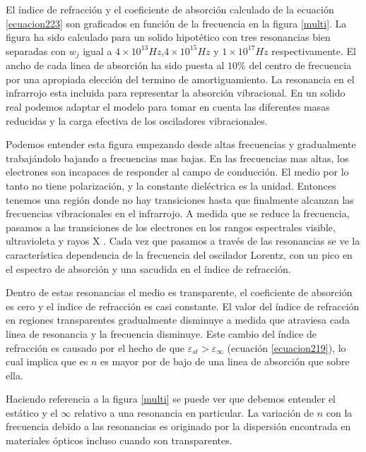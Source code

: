 \documentclass[a4paper,openright,12pt]{book}
\begin{document}
El índice de refracción y el coeficiente de absorción calculado de la ecuación \ref{ecuacion223} son graficados en función de la frecuencia en la figura \ref{multi}. La figura ha sido calculado para un solido hipotético con tres resonancias bien separadas con $w_{j}$ igual a $4\times 10^{13}Hz$,$4\times 10^{15}Hz$ y $1\times 10^{17}Hz$ respectivamente. El ancho de cada linea de absorción ha sido puesta al $10\%$ del centro de frecuencia por una apropiada elección del termino de amortiguamiento. La resonancia en el infrarrojo esta incluida para representar la absorción vibracional. En un solido real podemos adaptar el modelo para tomar en cuenta las diferentes masas reducidas y la carga efectiva de los osciladores vibracionales.

Podemos entender esta figura empezando desde altas frecuencias y gradualmente trabajándolo bajando a frecuencias mas bajas. En las frecuencias mas altas, los electrones son incapaces de responder al campo de conducción. El medio por lo tanto no tiene polarización, y la constante dieléctrica es la unidad. Entonces tenemos una región donde no hay transiciones hasta que finalmente alcanzan las frecuencias vibracionales en el infrarrojo. A medida que se reduce la frecuencia, pasamos a las transiciones de los electrones  en los rangos espectrales visible, ultravioleta y rayos X . Cada vez que pasamos a través de las resonancias se ve la característica dependencia de la frecuencia del oscilador Lorentz, con un pico en el espectro de absorción y una sacudida en el índice de refracción.

Dentro de estas resonancias el medio es transparente, el coeficiente de absorción es cero y el índice de refracción es casi constante.
El valor del índice de refracción en regiones transparentes gradualmente disminuye a medida que atraviesa cada linea de resonancia y la frecuencia disminuye. Este cambio del índice de refracción es causado por el hecho de que $\varepsilon_{st}>\varepsilon_{\infty}$ (ecuación \ref{ecuacion219}), lo cual implica que es $n$ es mayor por de bajo de una linea de absorción que sobre ella. 

Haciendo referencia a la figura \ref{multi} se puede ver que debemos entender el estático y el $\infty $ relativo a una resonancia en particular. La variación de $n$ con la frecuencia debido a las resonancias es originado por la dispersión  encontrada en materiales ópticos incluso cuando son transparentes. 
\end{document}
